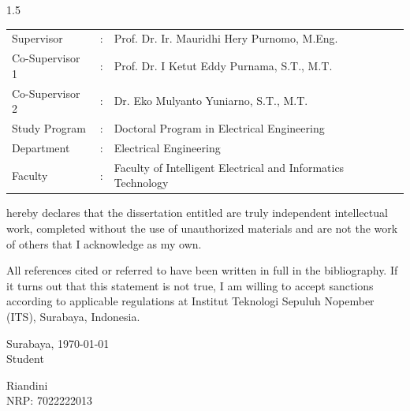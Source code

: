 {{\begin{spacing}{1.5}
\begin{tabularx}{\textwidth}{@{}p{3.2cm}p{0.3cm}>{\raggedright\arraybackslash}X@{}}
			Supervisor
			& : & Prof. Dr. Ir. Mauridhi Hery Purnomo, M.Eng.\\
			
			Co-Supervisor 1
			& : & Prof. Dr. I Ketut Eddy Purnama, S.T., M.T. \\
			
			Co-Supervisor 2
			& : & Dr. Eko Mulyanto Yuniarno, S.T., M.T.\\ 
			
			Study Program
			& : & Doctoral Program in Electrical Engineering \\
			
			Department
			& : & Electrical Engineering \\
			
			Faculty
			& : & Faculty of Intelligent Electrical and Informatics Technology \\
			\end{tabularx}
			
			\vspace{0.4cm}
			
			\justifying
			hereby declares that the dissertation entitled \textbf{\JdTesis} are truly independent intellectual work, completed without the use of unauthorized materials and are not the work of others that I acknowledge as my own.
			
			All references cited or referred to have been written in full in the bibliography. If it turns out that this statement is not true, I am willing to accept sanctions according to applicable regulations at Institut Teknologi Sepuluh Nopember (ITS), Surabaya, Indonesia.
			
			\begin{flushright}
				\begin{minipage}{15cm}
					\centering
					Surabaya, \today \\
					Student
					
					\vspace{3ex}
					
					\hspace*{-4cm}{\color{gray!50}\small [Materai]}
					
					\vspace{6ex}
					
					Riandini\\
					NRP: 7022222013\\
					\vspace{3ex}
				\end{minipage}
			\end{flushright}
			

\end{spacing}}}
